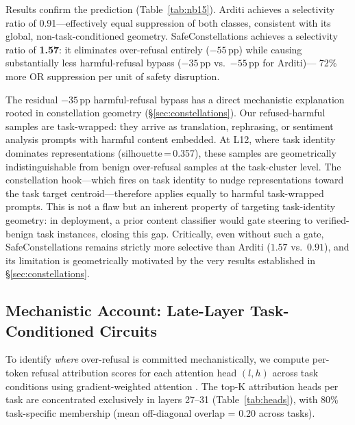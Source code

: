 \documentclass[11pt]{article}
\begin{document}
Results confirm the prediction (Table~\ref{tab:nb15}). Arditi achieves a selectivity
ratio of 0.91---effectively equal suppression of both classes, consistent with its
global, non-task-conditioned geometry. SafeConstellations achieves a selectivity
ratio of \textbf{1.57}: it eliminates over-refusal entirely ($-55$\,pp) while causing
substantially less harmful-refusal bypass ($-35$\,pp vs.\ $-55$\,pp for Arditi)---
72\% more OR suppression per unit of safety disruption.

The residual $-35$\,pp harmful-refusal bypass has a direct mechanistic explanation
rooted in constellation geometry (\S\ref{sec:constellations}). Our refused-harmful
samples are task-wrapped: they arrive as translation, rephrasing, or sentiment
analysis prompts with harmful content embedded. At L12, where task identity dominates
representations (silhouette\,=\,0.357), these samples are geometrically
indistinguishable from benign over-refusal samples at the task-cluster level.
The constellation hook---which fires on task identity to nudge representations toward
the task target centroid---therefore applies equally to harmful task-wrapped prompts.
This is not a flaw but an inherent property of targeting task-identity geometry: in
deployment, a prior content classifier would gate steering to verified-benign task
instances, closing this gap. Critically, even without such a gate, SafeConstellations
remains strictly more selective than Arditi ($1.57$ vs.\ $0.91$), and its limitation
is geometrically motivated by the very results established in \S\ref{sec:constellations}.

\subsection{Mechanistic Account: Late-Layer Task-Conditioned Circuits}
\label{sec:circuits}

To identify \emph{where} over-refusal is committed mechanistically, we compute per-token
refusal attribution scores for each attention head $(l, h)$ across task conditions using
gradient-weighted attention \citep{zhou2025safety}. The top-K attribution heads per task
are concentrated exclusively in layers 27--31 (Table~\ref{tab:heads}), with 80\%
task-specific membership (mean off-diagonal overlap = 0.20 across tasks).
\end{document}
